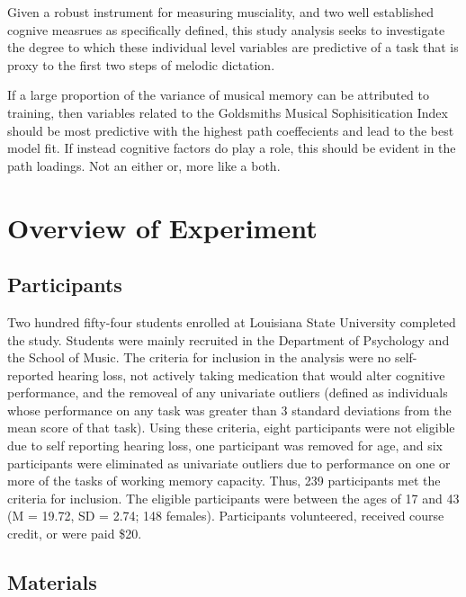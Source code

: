 \documentclass[]{book}
\begin{document}
Given a robust instrument for measuring musciality, and two well established cognive measrues as specifically defined, this study analysis seeks to investigate the degree to which these individual level variables are predictive of a task that is proxy to the first two steps of melodic dictation.

If a large proportion of the variance of musical memory can be attributed to training, then variables related to the Goldsmiths Musical Sophisitication Index should be most predictive with the highest path coeffecients and lead to the best model fit.
If instead cognitive factors do play a role, this should be evident in the path loadings.
Not an either or, more like a both.

\hypertarget{overview-of-experiment}{%
\section{Overview of Experiment}\label{overview-of-experiment}}

\hypertarget{participants}{%
\subsection{Participants}\label{participants}}

Two hundred fifty-four students enrolled at Louisiana State University completed the study.
Students were mainly recruited in the Department of Psychology and the School of Music.
The criteria for inclusion in the analysis were no self-reported hearing loss, not actively taking medication that would alter cognitive performance, and the removeal of any univariate outliers (defined as individuals whose performance on any task was greater than 3 standard deviations from the mean score of that task).
Using these criteria, eight participants were not eligible due to self reporting hearing loss, one participant was removed for age, and six participants were eliminated as univariate outliers due to performance on one or more of the tasks of working memory capacity.
Thus, 239 participants met the criteria for inclusion.
The eligible participants were between the ages of 17 and 43 (M = 19.72, SD = 2.74; 148 females).
Participants volunteered, received course credit, or were paid \$20.

\hypertarget{materials}{%
\subsection{Materials}\label{materials}}
\end{document}
